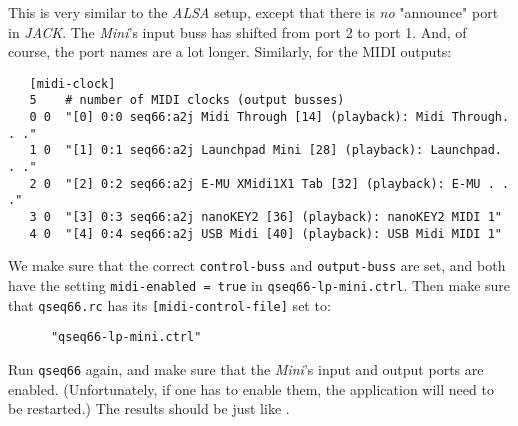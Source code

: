    This is very similar to the \textsl{ALSA} setup, except that there is
   \textsl{no}
   "announce" port in \textsl{JACK}.
   The \textsl{Mini}'s input buss has shifted from
   port 2 to port 1.  And, of course, the port names are a lot
   longer.  Similarly, for the MIDI outputs:

   \begin{verbatim}
   [midi-clock]
   5    # number of MIDI clocks (output busses)
   0 0  "[0] 0:0 seq66:a2j Midi Through [14] (playback): Midi Through. . ."
   1 0  "[1] 0:1 seq66:a2j Launchpad Mini [28] (playback): Launchpad. . ."
   2 0  "[2] 0:2 seq66:a2j E-MU XMidi1X1 Tab [32] (playback): E-MU . . ."
   3 0  "[3] 0:3 seq66:a2j nanoKEY2 [36] (playback): nanoKEY2 MIDI 1"
   4 0  "[4] 0:4 seq66:a2j USB Midi [40] (playback): USB Midi MIDI 1"
   \end{verbatim}

   We make sure that the correct \texttt{control-buss} and
   \texttt{output-buss} are set, and both have the setting
   \texttt{midi-enabled = true} in \texttt{qseq66-lp-mini.ctrl}.
   Then make sure that \texttt{qseq66.rc} has its
   \texttt{[midi-control-file]} set to:

   \begin{verbatim}
      "qseq66-lp-mini.ctrl"
   \end{verbatim}

   Run \texttt{qseq66} again, and make sure that the \textsl{Mini}'s
   input and output
   ports are enabled. (Unfortunately, if one has to enable them, the
   application will need to be restarted.)
   The results should be just like
   .

